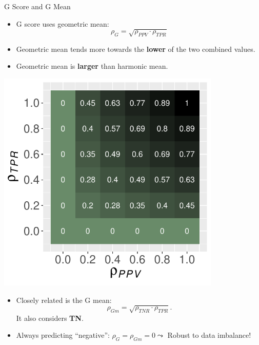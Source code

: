\documentclass[11pt,compress,t,notes=noshow, xcolor=table]{beamer}
\begin{document}
\begin{vbframe}{G Score and G Mean}
	\footnotesize{
    	\begin{minipage}[c]{0.49\textwidth}
        	\begin{itemize}
        		\item G score uses geometric mean: 
        		$$\rho_{G} = \sqrt{\rho_{PPV} \cdot \rho_{TPR}}$$

        		\item Geometric mean tends more towards the \textbf{lower} of the two combined values.
                \item Geometric mean is \textbf{larger} than harmonic mean.
        	\end{itemize}
        \end{minipage}
        \begin{minipage}[c]{0.49\textwidth}
        	\centering
        	\includegraphics[width=0.8\textwidth]{figure/g_score_plot.pdf}
        \end{minipage}

        \begin{itemize}
        	\item Closely related is the G mean:
        	$$\rho_{Gm} = \sqrt{\rho_{TNR} \cdot \rho_{TPR}}.$$
        	It also considers \textbf{TN}.
    
        	\item Always predicting \enquote{negative}: $\rho_{G} = \rho_{Gm}  = 0 \leadsto$ Robust to data imbalance!
        \end{itemize}
}
\end{vbframe}
\end{document}
